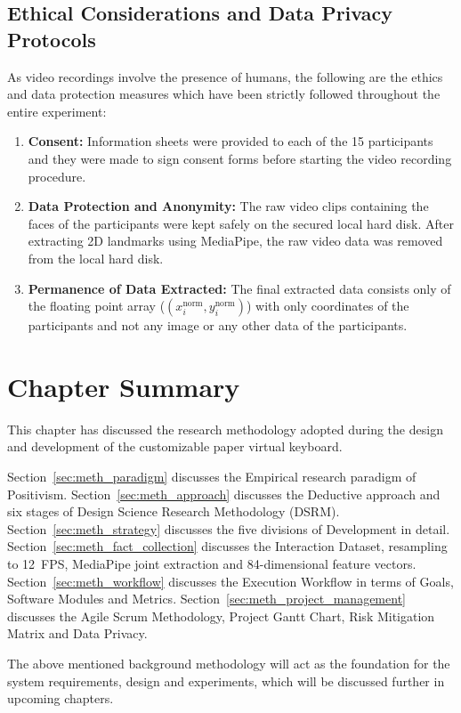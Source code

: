 \subsection{Ethical Considerations and Data Privacy Protocols}
\label{subsec:meth_ethics}
As video recordings involve the presence of humans, the following are the ethics and data protection measures which have been strictly followed throughout the entire experiment:
\begin{enumerate}
    \item \textbf{Consent:} Information sheets were provided to each of the 15 participants and they were made to sign consent forms before starting the video recording procedure.
    \item \textbf{Data Protection and Anonymity:} The raw video clips containing the faces of the participants were kept safely on the secured local hard disk. After extracting 2D landmarks using MediaPipe, the raw video data was removed from the local hard disk.
    \item \textbf{Permanence of Data Extracted:} The final extracted data consists only of the floating point array ($(x_i^{\text{norm}}, y_i^{\text{norm}})$) with only coordinates of the participants and not any image or any other data of the participants.
\end{enumerate}

\section{Chapter Summary}
\label{sec:meth_summary}
This chapter has discussed the research methodology adopted during the design and development of the customizable paper virtual keyboard.

Section~\ref{sec:meth_paradigm} discusses the Empirical research paradigm of Positivism. Section~\ref{sec:meth_approach} discusses the Deductive approach and six stages of Design Science Research Methodology (DSRM). Section~\ref{sec:meth_strategy} discusses the five divisions of Development in detail. Section~\ref{sec:meth_fact_collection} discusses the Interaction Dataset, resampling to 12~FPS, MediaPipe joint extraction and 84-dimensional feature vectors. Section~\ref{sec:meth_workflow} discusses the Execution Workflow in terms of Goals, Software Modules and Metrics. Section~\ref{sec:meth_project_management} discusses the Agile Scrum Methodology, Project Gantt Chart, Risk Mitigation Matrix and Data Privacy.

The above mentioned background methodology will act as the foundation for the system requirements, design and experiments, which will be discussed further in upcoming chapters.
